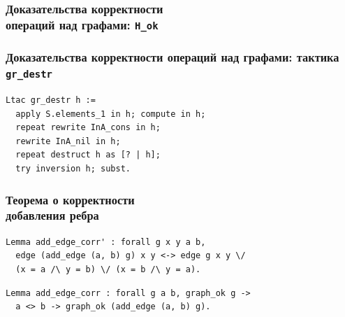 \documentclass[14pt]{beamer}
\begin{document}
\begin{frame}[fragile]
\frametitle{Доказательства корректности \\ операций над графами: {\tt H\_ok}}

\begin{figure}[h]
  \begin{minipage}[h]{1\linewidth}
  \end{minipage}
  \begin{minipage}[h]{1\linewidth}
  \end{minipage}
\end{figure}
\end{frame}

\begin{frame}[fragile]
\frametitle{Доказательства корректности операций над графами: тактика {\tt gr\_destr}}

\begin{verbatim}
Ltac gr_destr h := 
  apply S.elements_1 in h; compute in h;
  repeat rewrite InA_cons in h;
  rewrite InA_nil in h;
  repeat destruct h as [? | h]; 
  try inversion h; subst.
\end{verbatim}
\end{frame}


\begin{frame}[fragile]
\frametitle{Теорема о корректности \\ добавления ребра }

{\small 
\begin{verbatim}
Lemma add_edge_corr' : forall g x y a b,
  edge (add_edge (a, b) g) x y <-> edge g x y \/
  (x = a /\ y = b) \/ (x = b /\ y = a).
\end{verbatim}

\begin{verbatim}
Lemma add_edge_corr : forall g a b, graph_ok g -> 
  a <> b -> graph_ok (add_edge (a, b) g).
\end{verbatim} }

\end{frame}
\end{document}
